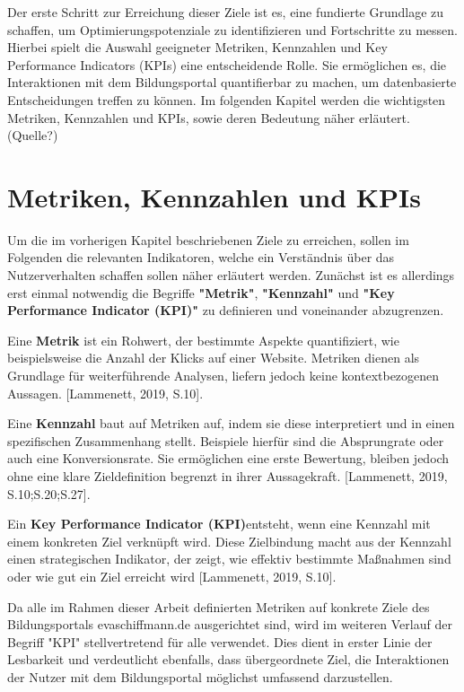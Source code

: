 Der erste Schritt zur Erreichung dieser Ziele ist es, eine fundierte Grundlage zu schaffen, um Optimierungspotenziale zu identifizieren und Fortschritte zu messen. Hierbei spielt die Auswahl geeigneter Metriken, Kennzahlen und Key Performance Indicators (KPIs) eine entscheidende Rolle. Sie ermöglichen es, die Interaktionen mit dem Bildungsportal quantifierbar zu machen, um datenbasierte Entscheidungen treffen zu können. Im folgenden Kapitel werden die wichtigsten Metriken, Kennzahlen und KPIs, sowie deren Bedeutung näher erläutert. (Quelle?)

\section{Metriken, Kennzahlen und KPIs} %
Um die im vorherigen Kapitel beschriebenen Ziele zu erreichen, sollen im Folgenden die relevanten Indikatoren, welche ein Verständnis über das Nutzerverhalten schaffen sollen näher erläutert werden. Zunächst ist es allerdings erst einmal notwendig die Begriffe \textbf{"Metrik"}, \textbf{"Kennzahl"} und \textbf{"Key Performance Indicator (KPI)"} zu definieren und voneinander abzugrenzen.

Eine \textbf{Metrik} ist ein Rohwert, der bestimmte Aspekte quantifiziert, wie beispielsweise die Anzahl der Klicks auf einer Website. Metriken dienen als Grundlage für weiterführende Analysen, liefern jedoch keine kontextbezogenen Aussagen. [Lammenett, 2019, S.10].

Eine \textbf{Kennzahl} baut auf Metriken auf, indem sie diese interpretiert und in einen spezifischen Zusammenhang stellt. Beispiele hierfür sind die Absprungrate oder auch eine Konversionsrate. Sie ermöglichen eine erste Bewertung, bleiben jedoch ohne eine klare Zieldefinition begrenzt in ihrer Aussagekraft. [Lammenett, 2019, S.10;S.20;S.27].

Ein \textbf{Key Performance Indicator (KPI)}entsteht, wenn eine Kennzahl mit einem konkreten Ziel verknüpft wird. Diese Zielbindung macht aus der Kennzahl einen strategischen Indikator, der zeigt, wie effektiv bestimmte Maßnahmen sind oder wie gut ein Ziel erreicht wird [Lammenett, 2019, S.10].

Da alle im Rahmen dieser Arbeit definierten Metriken auf konkrete Ziele des Bildungsportals evaschiffmann.de ausgerichtet sind, wird im weiteren Verlauf der Begriff "KPI" stellvertretend für alle verwendet. Dies dient in erster Linie der Lesbarkeit und verdeutlicht ebenfalls, dass übergeordnete Ziel, die Interaktionen der Nutzer mit dem Bildungsportal möglichst umfassend darzustellen.

